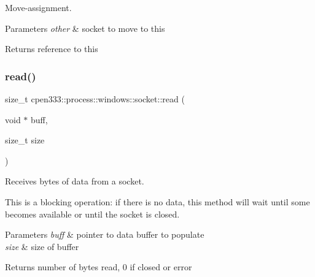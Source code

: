 Move-\/assignment. 


\begin{DoxyParams}{Parameters}
{\em other} & socket to move to this \\
\hline
\end{DoxyParams}
\begin{DoxyReturn}{Returns}
reference to this 
\end{DoxyReturn}
\mbox{\label{classcpen333_1_1process_1_1windows_1_1socket_ad6448dd6a72e2c35a2c98cb05aef38fb}} 
\subsubsection{\texorpdfstring{read()}{read()}}
{\footnotesize\ttfamily size\+\_\+t cpen333\+::process\+::windows\+::socket\+::read (\begin{DoxyParamCaption}\item[{void $\ast$}]{buff,  }\item[{size\+\_\+t}]{size }\end{DoxyParamCaption})\hspace{0.3cm}{\ttfamily [inline]}}



Receives bytes of data from a socket. 

This is a blocking operation\+: if there is no data, this method will wait until some becomes available or until the socket is closed.


\begin{DoxyParams}{Parameters}
{\em buff} & pointer to data buffer to populate \\
\hline
{\em size} & size of buffer \\
\hline
\end{DoxyParams}
\begin{DoxyReturn}{Returns}
number of bytes read, 0 if closed or error 
\end{DoxyReturn}
\mbox{\label{classcpen333_1_1process_1_1windows_1_1socket_a145fb57f3d1f61fd4a127e2eec89a216}} 
